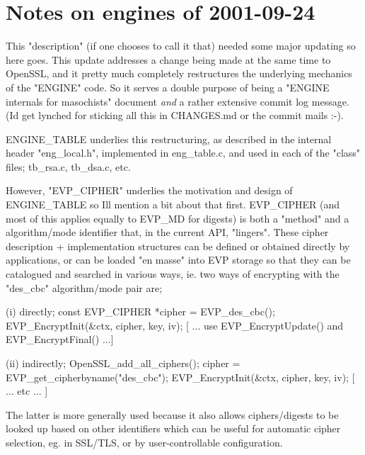 \chapter{Notes on engines of 2001-\/09-\/24}
\hypertarget{md__c_1_2_users_2namph_2_downloads_2openssl_2openssl-3_82_81_2crypto_2engine_2_r_e_a_d_m_e}{}\label{md__c_1_2_users_2namph_2_downloads_2openssl_2openssl-3_82_81_2crypto_2engine_2_r_e_a_d_m_e}
This "{}description"{} (if one chooses to call it that) needed some major updating so here goes. This update addresses a change being made at the same time to Open\+SSL, and it pretty much completely restructures the underlying mechanics of the "{}\+ENGINE"{} code. So it serves a double purpose of being a "{}\+ENGINE internals for masochists"{} document {\itshape and} a rather extensive commit log message. (I\textquotesingle{}d get lynched for sticking all this in CHANGES.\+md or the commit mails \+:-\/).

ENGINE\+\_\+\+TABLE underlies this restructuring, as described in the internal header "{}eng\+\_\+local.\+h"{}, implemented in eng\+\_\+table.\+c, and used in each of the "{}class"{} files; tb\+\_\+rsa.\+c, tb\+\_\+dsa.\+c, etc.

However, "{}\+EVP\+\_\+\+CIPHER"{} underlies the motivation and design of ENGINE\+\_\+\+TABLE so I\textquotesingle{}ll mention a bit about that first. EVP\+\_\+\+CIPHER (and most of this applies equally to EVP\+\_\+\+MD for digests) is both a "{}method"{} and a algorithm/mode identifier that, in the current API, "{}lingers"{}. These cipher description + implementation structures can be defined or obtained directly by applications, or can be loaded "{}en masse"{} into EVP storage so that they can be catalogued and searched in various ways, ie. two ways of encrypting with the "{}des\+\_\+cbc"{} algorithm/mode pair are; \begin{DoxyVerb}(i) directly;
     const EVP_CIPHER *cipher = EVP_des_cbc();
     EVP_EncryptInit(&ctx, cipher, key, iv);
     [ ... use EVP_EncryptUpdate() and EVP_EncryptFinal() ...]

(ii) indirectly;
     OpenSSL_add_all_ciphers();
     cipher = EVP_get_cipherbyname("des_cbc");
     EVP_EncryptInit(&ctx, cipher, key, iv);
     [ ... etc ... ]
\end{DoxyVerb}
 The latter is more generally used because it also allows ciphers/digests to be looked up based on other identifiers which can be useful for automatic cipher selection, eg. in SSL/\+TLS, or by user-\/controllable configuration.

